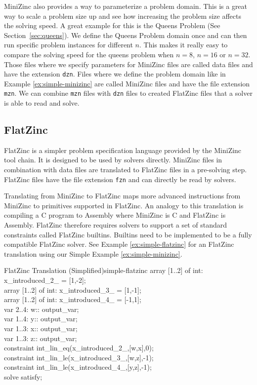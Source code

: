 MiniZinc also provides a way to parameterize a problem domain. This is a great way to scale a problem size up and see how increasing the problem size affects the solving speed. A great example for this is the Queens Problem (See Section~\ref{sec:queens}). We define the Queens Problem domain once and can then run specific problem instances for different $n$. This makes it really easy to compare the solving speed for the queens problem when $n = 8$, $n = 16$ or $n = 32$. Those files where we specify parameters for MiniZinc files are called data files and have the extension \verb|dzn|. Files where we define the problem domain like in Example \ref{ex:simple-minizinc} are called MiniZinc files and have the file extension \verb|mzn|. We can combine \verb|mzn| files with \verb|dzn| files to created FlatZinc files that a solver is able to read and solve.

\subsection{FlatZinc}

FlatZinc is a simpler problem specification language provided by the MiniZinc tool chain. It is designed to be used by solvers directly. MiniZinc files in combination with data files are translated to FlatZinc files in a pre-solving step. FlatZinc files have the file extension \verb|fzn| and can directly be read by solvers.

Translating from MiniZinc to FlatZinc maps more advanced instructions from MiniZinc to primitives supported in FlatZinc. An analogy to this translation is compiling a C program to Assembly where MiniZinc is C and FlatZinc is Assembly. FlatZinc therefore requires solvers to support a set of standard constraints called FlatZinc builtins. Builtins need to be implemented to be a fully compatible FlatZinc solver. See Example \ref{ex:simple-flatzinc} for an FlatZinc translation using our Simple Example \ref{ex:simple-minizinc}.

\begin{example}{FlatZinc Translation (Simplified)}{simple-flatzinc}
	array [1..2] of int: x\_introduced\_2\_ = [1,-2]; \\
	array [1..2] of int: x\_introduced\_3\_ = [1,-1]; \\
	array [1..2] of int: x\_introduced\_4\_ = [-1,1]; \\
	var 2..4: w:: output\_var; \\
	var 1..4: y:: output\_var; \\
	var 1..3: x:: output\_var; \\
	var 1..3: z:: output\_var; \\
	constraint int\_lin\_eq(x\_introduced\_2\_,[w,x],0); \\
	constraint int\_lin\_le(x\_introduced\_3\_,[w,z],-1); \\
	constraint int\_lin\_le(x\_introduced\_4\_,[y,z],-1); \\
	solve  satisfy;
\end{example}

